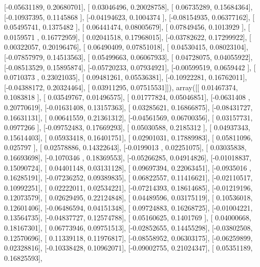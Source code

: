\documentclass{article}
\begin{document}
       [-0.05631189,  0.20680701],
       [ 0.03046496,  0.20028758],
       [ 0.06735289,  0.15684364],
       [-0.10937395,  0.1145868 ],
       [-0.04194623,  0.1004374 ],
       [-0.08154935,  0.06377162],
       [ 0.05495741,  0.1375482 ],
       [ 0.06441474,  0.08005679],
       [ 0.07849456,  0.1013929 ],
       [ 0.0159571 ,  0.16772959],
       [ 0.02041518,  0.17968015],
       [-0.03782622,  0.17299922],
       [ 0.00322057,  0.20196476],
       [ 0.06490409,  0.07851018],
       [ 0.04530415,  0.08023104],
       [-0.07857979,  0.14513563],
       [ 0.05499663,  0.06067933],
       [ 0.04728075,  0.04055922],
       [-0.08513529,  0.15895874],
       [-0.05720233,  0.07934921],
       [-0.00599519,  0.0659442 ],
       [ 0.0710373 ,  0.23021035],
       [ 0.09481261,  0.05536381],
       [-0.10922281,  0.16762011],
       [-0.04388172,  0.20324464],
       [ 0.03911295,  0.07515531]]), array([[ 0.01467374,  0.1083818 ],
       [ 0.03549767,  0.01496575],
       [ 0.01777824,  0.05046851],
       [-0.0631408 ,  0.20770619],
       [-0.01631408,  0.13157363],
       [ 0.03285621,  0.16866875],
       [-0.08431727,  0.16631131],
       [ 0.00641559,  0.21361312],
       [-0.04561569,  0.06700356],
       [ 0.03157731,  0.0977266 ],
       [-0.09752483,  0.17669293],
       [ 0.05030588,  0.2185312 ],
       [ 0.04937343,  0.15614403],
       [ 0.05933418,  0.16401751],
       [ 0.02901031,  0.17889983],
       [ 0.05811096,  0.025797  ],
       [ 0.02578886,  0.14322643],
       [-0.0199013 ,  0.02251075],
       [ 0.03035838,  0.16693698],
       [-0.1070346 ,  0.18369553],
       [-0.05266285,  0.04914826],
       [-0.01018837,  0.15090724],
       [ 0.04401148,  0.03131128],
       [ 0.09697394,  0.22063451],
       [-0.0935016 ,  0.16285191],
       [-0.07236252,  0.09389835],
       [ 0.06822557,  0.11416621],
       [-0.02110517,  0.10992251],
       [ 0.02222011,  0.02534221],
       [-0.07214393,  0.18614685],
       [-0.01219196,  0.12073579],
       [ 0.02629495,  0.22124848],
       [ 0.04489596,  0.03175119],
       [ 0.10536018,  0.12601406],
       [-0.06486594,  0.04151348],
       [ 0.09724883,  0.16268725],
       [-0.01004221,  0.13564735],
       [-0.04837727,  0.12574788],
       [ 0.05160625,  0.1401769 ],
       [ 0.04000668,  0.18167301],
       [ 0.06773946,  0.09751513],
       [-0.02852655,  0.14455298],
       [-0.03802508,  0.12570696],
       [ 0.11339118,  0.11976817],
       [-0.08558952,  0.06303175],
       [-0.06259899,  0.02328816],
       [-0.10338428,  0.10962071],
       [-0.09002755,  0.21024347],
       [ 0.05351189,  0.16825593],
\end{document}

